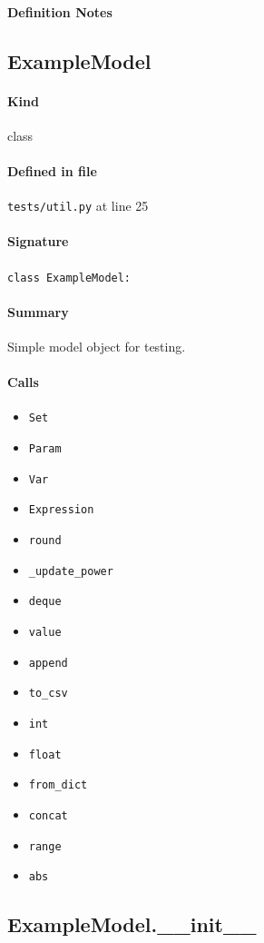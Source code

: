 \documentclass[11pt]{report}
\begin{document}
\paragraph{Definition Notes}
\subsection{ExampleModel}
\label{def:tests-util.py:ExampleModel:L25}
\paragraph{Kind} class
\paragraph{Defined in file} \texttt{tests/util.py} at line 25
\paragraph{Signature} \texttt{class ExampleModel:}
\paragraph{Summary} Simple model object for testing.
\paragraph{Calls}
\begin{itemize}[leftmargin=*]
  \item \texttt{Set}
  \item \texttt{Param}
  \item \texttt{Var}
  \item \texttt{Expression}
  \item \texttt{round}
  \item \texttt{\_update\_power}
  \item \texttt{deque}
  \item \texttt{value}
  \item \texttt{append}
  \item \texttt{to\_csv}
  \item \texttt{int}
  \item \texttt{float}
  \item \texttt{from\_dict}
  \item \texttt{concat}
  \item \texttt{range}
  \item \texttt{abs}
\end{itemize}
\subsection{ExampleModel.\_\_init\_\_}
\label{def:tests-util.py:ExampleModel.__init__:L30}
\end{document}
